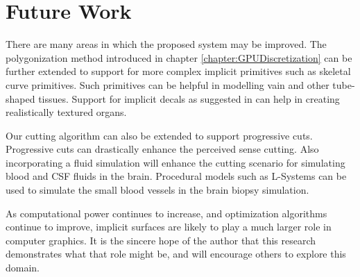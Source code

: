 \section{Future Work}
There are many areas in which the proposed system may be improved. The polygonization method 
introduced in chapter \ref{chapter:GPUDiscretization} can be further extended to support for more 
complex implicit primitives such as skeletal curve primitives. Such primitives can be helpful in modelling 
vain and other tube-shaped tissues. Support for implicit decals as suggested in \cite{Schmidtb} can help 
in creating realistically textured organs. 

Our cutting algorithm can also be extended to support progressive cuts. Progressive cuts can drastically 
enhance the perceived sense cutting. Also incorporating a fluid simulation will enhance the cutting 
scenario for simulating blood and CSF fluids in the brain. Procedural models such as L-Systems can be 
used to simulate the small blood vessels in the brain biopsy simulation. 

As computational power continues to increase, and optimization algorithms continue to improve, implicit 
surfaces are likely to play a much larger role in computer graphics. It is the sincere hope of the author 
that this research demonstrates what that role might be, and will encourage others to explore this domain.



